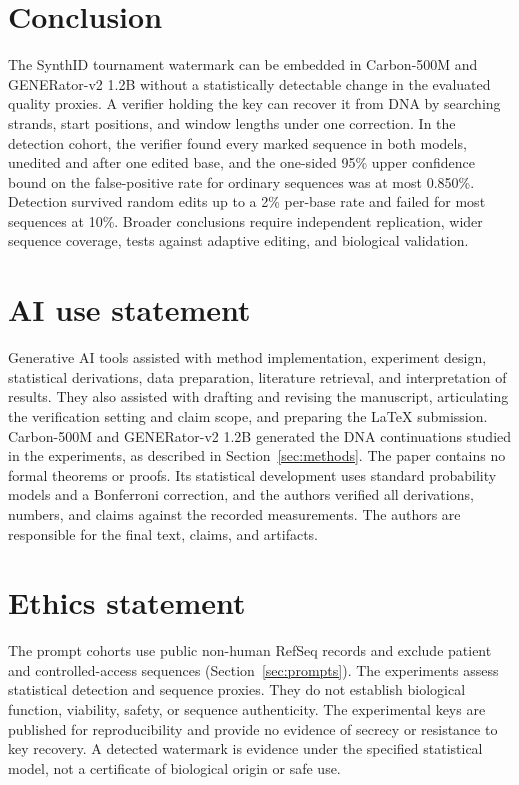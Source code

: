 \documentclass[10pt,twocolumn]{article}
\begin{document}
\section{Conclusion}

The SynthID tournament watermark can be embedded in Carbon-500M and GENERator-v2 1.2B without a
statistically detectable change in the evaluated quality proxies. A verifier holding the key can
recover it from DNA by searching strands, start positions, and window lengths under one
correction. In the detection cohort, the verifier found every marked sequence in both models, unedited
and after one edited base, and the one-sided 95\% upper confidence bound on the false-positive rate
for ordinary sequences was at most 0.850\%. Detection survived random edits up to a 2\% per-base rate
and failed for most sequences at 10\%. Broader conclusions require independent replication, wider
sequence coverage, tests against adaptive editing, and biological validation.

\section*{AI use statement}

Generative AI tools assisted with method implementation, experiment design, statistical
derivations, data preparation, literature retrieval, and interpretation of results. They also
assisted with drafting and revising the manuscript, articulating the verification setting and
claim scope, and preparing the \LaTeX{} submission. Carbon-500M and GENERator-v2 1.2B generated
the DNA continuations studied in the experiments, as described in Section~\ref{sec:methods}.
The paper contains no formal theorems or proofs. Its statistical development uses standard
probability models and a Bonferroni correction, and the authors verified all derivations,
numbers, and claims against the recorded measurements. The authors are responsible for the final
text, claims, and artifacts.

\section*{Ethics statement}

The prompt cohorts use public non-human RefSeq records and exclude patient and
controlled-access sequences (Section~\ref{sec:prompts}). The experiments assess statistical
detection and sequence proxies. They do not establish biological function, viability, safety, or
sequence authenticity. The experimental keys are published for reproducibility and provide no
evidence of secrecy or resistance to key recovery. A detected watermark is evidence under the
specified statistical model, not a certificate of biological origin or safe use.
\end{document}
